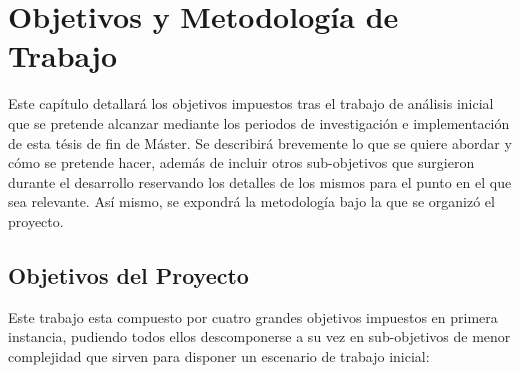 \chapter{Objetivos y Metodología de Trabajo}

Este capítulo detallará los objetivos impuestos tras el trabajo de análisis inicial que se pretende alcanzar mediante los periodos de investigación e implementación de esta tésis de fin de Máster. Se describirá brevemente lo que se quiere abordar y cómo se pretende hacer, además de incluir otros sub-objetivos que surgieron durante el desarrollo reservando los detalles de los mismos para el punto en el que sea relevante. Así mismo, se expondrá la metodología bajo la que se organizó el proyecto.

\section{Objetivos del Proyecto}

Este trabajo esta compuesto por cuatro grandes objetivos impuestos en primera instancia, pudiendo todos ellos descomponerse a su vez en sub-objetivos de menor complejidad que sirven para disponer un escenario de trabajo inicial:

